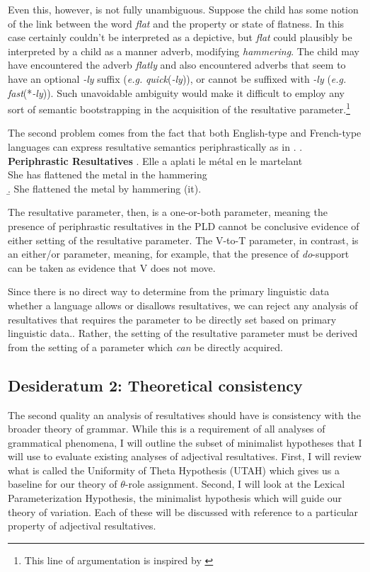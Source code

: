 \documentclass[MilwayThesis]{subfiles}
\begin{document}
Even this, however, is not fully unambiguous.
Suppose the child has some notion of the link between the word \textit{flat} and the property or state of flatness.
In this case \Last[b] certainly couldn't be interpreted as a depictive, but \textit{flat} could plausibly be interpreted by a child as a manner adverb, modifying \textit{hammering}.
The child may have encountered the adverb \textit{flatly} and also encountered adverbs that seem to have an optional \textit{-ly} suffix (\textit{e.g.} \textit{quick}(\textit{-ly})), or cannot be suffixed with \textit{-ly} (\textit{e.g.} \textit{fast}(*\textit{-ly})).
Such unavoidable ambiguity would make it difficult to employ any sort of semantic bootstrapping in the acquisition of the resultative parameter.\footnote{
	This line of argumentation is inspired by \textcite{gleitman1990structural,carey1985constraints,quine1960word} 
}

The second problem comes from the fact that both English-type and French-type languages can express resultative semantics periphrastically as in \Next.
\ex. \textbf{Periphrastic Resultatives}
\ag. Elle a aplati le m\'etal en le martelant\\
She has flattened the metal in the hammering\\
\b. She flattened the metal by hammering (it).

The resultative parameter, then, is a one-or-both parameter, meaning the presence of periphrastic resultatives in the PLD cannot be conclusive evidence of either setting of the resultative parameter.
The V-to-T parameter, in contrast, is an either/or parameter, meaning, for example, that the presence of \textit{do}-support can be taken as evidence that V does not move.

Since there is no direct way to determine from the primary linguistic data whether a language allows or disallows resultatives, we can reject any analysis of resultatives that requires the parameter to be directly set based on primary linguistic data..
Rather, the setting of the resultative parameter must be derived from the setting of a parameter which \textit{can} be directly acquired.

\subsection{Desideratum 2: Theoretical consistency}
The second quality an analysis of resultatives should have is consistency with the broader theory of grammar.
While this is a requirement of all analyses of grammatical phenomena, I will outline the subset of minimalist hypotheses that I will use to evaluate existing analyses of adjectival resultatives.
First, I will review what is called the Uniformity of Theta Hypothesis (UTAH) which gives us a baseline for our theory of $\theta$-role assignment.
Second, I will look at the Lexical Parameterization Hypothesis, the minimalist hypothesis which will guide our theory of variation.
Each of these will be discussed with reference to a particular property of adjectival resultatives.
\end{document}
